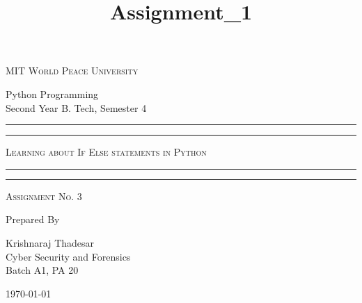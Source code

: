 \documentclass[11pt]{article}
\title{Assignment\_1}
\begin{document}
\begin{titlepage}
	\centering


	\huge\textsc{
		MIT World Peace University
	}\\

	\vspace{0.75\baselineskip} %

	\LARGE{
		Python Programming\\
		Second Year B. Tech, Semester 4
	}

	\vfill %


	\rule{\textwidth}{1.6pt}\vspace*{-\baselineskip}\vspace*{2pt}
	\rule{\textwidth}{0.6pt}
	\vspace{0.75\baselineskip} %



	\huge{\textsc{
		Learning about If Else statements in Python		
	}} \\



	\vspace{0.5\baselineskip} %
	\rule{\textwidth}{0.6pt}\vspace*{-\baselineskip}\vspace*{2.8pt}
	\rule{\textwidth}{1.6pt}

	\vspace{1\baselineskip} %


	\LARGE\textsc{
		Assignment No. 3
	} %
	\vfill


	Prepared By
	\vspace{0.5\baselineskip} %

	\Large{
		Krishnaraj Thadesar \\
		Cyber Security and Forensics\\
		Batch A1, PA 20
	}


	\vspace{0.5\baselineskip} %
	\today

\end{titlepage}
\end{document}
